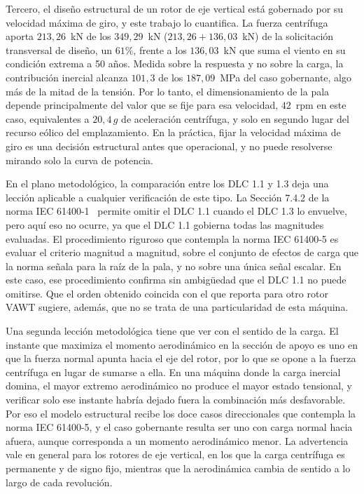 Tercero, el diseño estructural de un rotor de eje vertical está gobernado por su velocidad máxima de giro, y este trabajo lo cuantifica. La fuerza centrífuga aporta $213{,}26$~kN de los $349{,}29$~kN ($213{,}26 + 136{,}03$~kN) de la solicitación transversal de diseño, un $61\%$, frente a los $136{,}03$~kN que suma el viento en su condición extrema a 50 años. Medida sobre la respuesta y no sobre la carga, la contribución inercial alcanza $101{,}3$ de los $187{,}09$~MPa del caso gobernante, algo más de la mitad de la tensión. Por lo tanto, el dimensionamiento de la pala depende principalmente del valor que se fije para esa velocidad, $42$~rpm en este caso, equivalentes a $20{,}4\,g$ de aceleración centrífuga, y solo en segundo lugar del recurso eólico del emplazamiento. En la práctica, fijar la velocidad máxima de giro es una decisión estructural antes que operacional, y no puede resolverse mirando solo la curva de potencia.

En el plano metodológico, la comparación entre los DLC 1.1 y 1.3 deja una lección aplicable a cualquier verificación de este tipo. La Sección 7.4.2 de la norma IEC 61400-1~\parencite*{IEC61400-1} permite omitir el DLC 1.1 cuando el DLC 1.3 lo envuelve, pero aquí eso no ocurre, ya que el DLC 1.1 gobierna todas las magnitudes evaluadas. El procedimiento riguroso que contempla la norma IEC 61400-5 es evaluar el criterio magnitud a magnitud, sobre el conjunto de efectos de carga que la norma señala para la raíz de la pala, y no sobre una única señal escalar. En este caso, ese procedimiento confirma sin ambigüedad que el DLC 1.1 no puede omitirse. Que el orden obtenido coincida con el que \textcite{Galinos2015} reporta para otro rotor VAWT sugiere, además, que no se trata de una particularidad de esta máquina.

Una segunda lección metodológica tiene que ver con el sentido de la carga. El instante que maximiza el momento aerodinámico en la sección de apoyo es uno en que la fuerza normal apunta hacia el eje del rotor, por lo que se opone a la fuerza centrífuga en lugar de sumarse a ella. En una máquina donde la carga inercial domina, el mayor extremo aerodinámico no produce el mayor estado tensional, y verificar solo ese instante habría dejado fuera la combinación más desfavorable. Por eso el modelo estructural recibe los doce casos direccionales que contempla la norma IEC 61400-5, y el caso gobernante resulta ser uno con carga normal hacia afuera, aunque corresponda a un momento aerodinámico menor. La advertencia vale en general para los rotores de eje vertical, en los que la carga centrífuga es permanente y de signo fijo, mientras que la aerodinámica cambia de sentido a lo largo de cada revolución.

